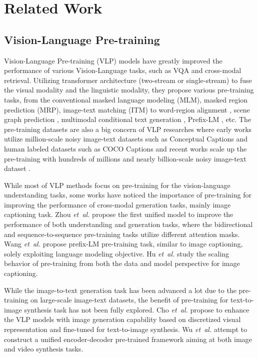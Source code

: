 \documentclass{article}
\begin{document}
\section{Related Work}
\subsection{Vision-Language Pre-training}
Vision-Language Pre-training (VLP) models \cite{lu2019vilbert,zhou2020unified,chen2019uniter,yu2020ernie,gan2020large,li2020unimo,zhang2021vinvl} have greatly improved the performance of various Vision-Language tasks, such as VQA and cross-modal retrieval. 
Utilizing transformer architecture (two-stream or single-stream) to fuse the visual modality and the linguistic modality, they propose various pre-training tasks, from the conventional masked language modeling (MLM), masked region prediction (MRP), image-text matching (ITM) to word-region alignment \cite{chen2019uniter}, scene graph prediction \cite{yu2020ernie}, multimodal conditional text generation \cite{cho2021unifying}, Prefix-LM \cite{wang2021simvlm}, etc. The pre-training datasets are also a big concern of VLP researches where early works utilize million-scale noisy image-text datasets such as Conceptual Captions \cite{sharma2018conceptual} and human labeled datasets such as COCO Captions \cite{chen2015microsoft} and recent works scale up the pre-training with hundreds of millions and nearly billion-scale noisy image-text dataset \cite{wang2021simvlm}.

While most of VLP methods focus on pre-training for the vision-language understanding tasks, some works have noticed the importance of pre-training for improving the performance of cross-modal generation tasks, mainly image captioning task. Zhou {\em et\  al.} \cite{zhou2020unified} propose the first unified model to improve the performance of both understanding and generation tasks, where the bidirectional and sequence-to-sequence pre-training tasks utilize different attention masks. Wang {\em et\ al.} \cite{wang2021simvlm} propose prefix-LM pre-training task, similar to image captioning, solely exploiting language modeling objective. Hu {\em et\ al.} \cite{hu2021scaling} study the scaling behavior of pre-training from both the data and model perspective for image captioning.

While the image-to-text generation task has been advanced a lot due to the pre-training on large-scale image-text datasets, the benefit of pre-training for text-to-image synthesis task has not been fully explored. Cho {\em et\ al.} \cite{cho2020x} propose to enhance the VLP models  with image generation capability based on discretized visual representation and fine-tuned for text-to-image synthesis. Wu {\em et\ al.} \cite{wu2021n} attempt to construct a unified encoder-decoder pre-trained framework aiming at both image and video synthesis tasks. 
\end{document}

